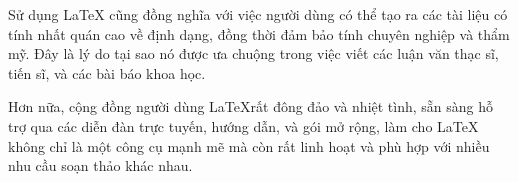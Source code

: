 \documentclass[a4paper,UKenglish,cleveref, autoref, thm-restate]{lipics-v2021}
\begin{document}
Sử dụng  {\LaTeX} cũng đồng nghĩa với việc người dùng có thể tạo ra các tài liệu có tính nhất quán cao về định dạng, đồng thời đảm bảo tính chuyên nghiệp và thẩm mỹ. Đây là lý do tại sao nó được ưa chuộng trong việc viết các luận văn thạc sĩ, tiến sĩ, và các bài báo khoa học.

Hơn nữa, cộng đồng người dùng  {\LaTeX}rất đông đảo và nhiệt tình, sẵn sàng hỗ trợ qua các diễn đàn trực tuyến, hướng dẫn, và gói mở rộng, làm cho  {\LaTeX} không chỉ là một công cụ mạnh mẽ mà còn rất linh hoạt và phù hợp với nhiều nhu cầu soạn thảo khác nhau. 


\end{document}

